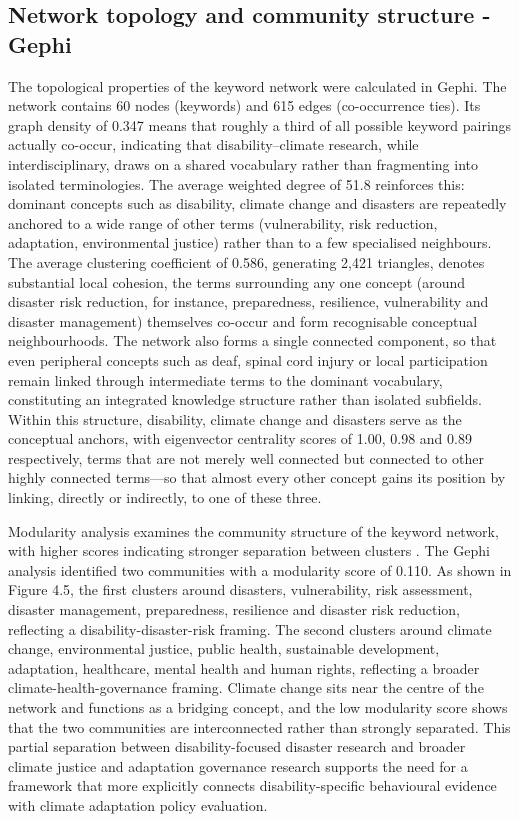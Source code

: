 \documentclass[12pt,a4paper]{report}
\begin{document}
\subsection{Network topology and community structure - Gephi}
The topological properties of the keyword network were calculated in Gephi. The network contains 60 nodes (keywords) and 615 edges (co-occurrence ties). Its graph density of 0.347 means that roughly a third of all possible keyword pairings actually co-occur, indicating that disability–climate research, while interdisciplinary, draws on a shared vocabulary rather than fragmenting into isolated terminologies. The average weighted degree of 51.8 reinforces this: dominant concepts such as disability, climate change and disasters are repeatedly anchored to a wide range of other terms (vulnerability, risk reduction, adaptation, environmental justice) rather than to a few specialised neighbours. The average clustering coefficient of 0.586, generating 2,421 triangles, denotes substantial local cohesion, the terms surrounding any one concept (around disaster risk reduction, for instance, preparedness, resilience, vulnerability and disaster management) themselves co-occur and form recognisable conceptual neighbourhoods. The network also forms a single connected component, so that even peripheral concepts such as deaf, spinal cord injury or local participation remain linked through intermediate terms to the dominant vocabulary, constituting an integrated knowledge structure rather than isolated subfields. Within this structure, disability, climate change and disasters serve as the conceptual anchors, with eigenvector centrality scores of 1.00, 0.98 and 0.89 respectively, terms that are not merely well connected but connected to other highly connected terms—so that almost every other concept gains its position by linking, directly or indirectly, to one of these three.

Modularity analysis examines the community structure of the keyword network, with higher scores indicating stronger separation between clusters \cite{newman_2006_modularity}.  The Gephi analysis identified two communities with a modularity score of 0.110. As shown in Figure 4.5, the first clusters around disasters, vulnerability, risk assessment, disaster management, preparedness, resilience and disaster risk reduction, reflecting a disability-disaster-risk framing. The second clusters around climate change, environmental justice, public health, sustainable development, adaptation, healthcare, mental health and human rights, reflecting a broader climate-health-governance framing. Climate change sits near the centre of the network and functions as a bridging concept, and the low modularity score shows that the two communities are interconnected rather than strongly separated. This partial separation between disability-focused disaster research and broader climate justice and adaptation governance research supports the need for a framework that more explicitly connects disability-specific behavioural evidence with climate adaptation policy evaluation.
\end{document}
